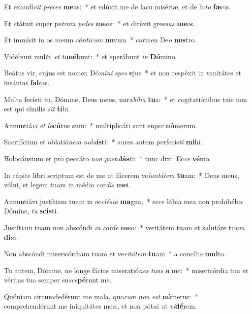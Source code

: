 \item Et exaudí\textit{vit} \textit{pre}\textit{ces} \textbf{me}as:~* et edúxit me de lacu misériæ, et de lu\textit{to} \textbf{fæ}cis.
\item Et státuit super pe\textit{tram} \textit{pe}\textit{des} \textbf{me}os:~* et diréxit gres\textit{sus} \textbf{me}os.
\item Et immísit in os meum \textit{cán}\textit{ti}\textit{cum} \textbf{no}vum~* carmen De\textit{o} \textbf{nos}tro.
\item Vidébunt mul\textit{ti}, \textit{et} \textit{ti}\textbf{mé}bunt:~* et sperábunt \textit{in} \textbf{Dó}mino.
\item Beátus vir, cujus est nomen Dó\textit{mi}\textit{ni} \textit{spes} \textbf{e}jus~* et non respéxit in vanitátes et insáni\textit{as} \textbf{fal}sas.
\item Multa fecísti tu, Dómine, Deus meus, mira\textit{bí}\textit{li}\textit{a} \textbf{tu}a:~* et cogitatiónibus tuis non est qui símilis \textit{sit} \textbf{ti}bi.
\item Annuntiá\textit{vi} \textit{et} \textit{lo}\textbf{cú}tus sum:~* multiplicáti sunt su\textit{per} \textbf{nú}merum.
\item Sacrifícium et oblatió\textit{nem} \textit{no}\textit{lu}\textbf{ís}ti:~* aures autem perfecís\textit{ti} \textbf{mi}hi.
\item Holocáustum et pro peccáto \textit{non} \textit{pos}\textit{tu}\textbf{lás}ti:~* tunc dixi: Ec\textit{ce} \textbf{vé}nio.
\item In cápite libri scriptum est de me ut fácerem vo\textit{lun}\textit{tá}\textit{tem} \textbf{tu}am:~* Deus meus, vólui, et legem tuam in médio cor\textit{dis} \textbf{me}i.
\item Annuntiávi justítiam tuam in ec\textit{clé}\textit{si}\textit{a} \textbf{ma}gna,~* ecce lábia mea non prohibébo: Dómine, \textit{tu} \textbf{scis}ti.
\item Justítiam tuam non abscóndi \textit{in} \textit{cor}\textit{de} \textbf{me}o:~* veritátem tuam et salutáre tu\textit{um} \textbf{di}xi.
\item Non abscóndi misericórdiam tuam et ve\textit{ri}\textit{tá}\textit{tem} \textbf{tu}am~* a concíli\textit{o} \textbf{mul}to.
\item Tu autem, Dómine, ne longe fácias miseratió\textit{nes} \textit{tu}\textit{as} \textbf{a} me:~* misericórdia tua et véritas tua semper su\textit{sce}\textbf{pé}runt me.
\item Quóniam circumdedérunt me mala, quo\textit{rum} \textit{non} \textit{est} \textbf{nú}merus:~* comprehendérunt me iniquitátes meæ, et non pótui ut \textit{vi}\textbf{dé}rem.

